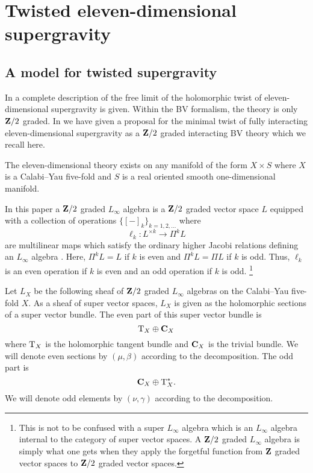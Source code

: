 \documentclass[11pt]{amsart}
\begin{document}
\section{Twisted eleven-dimensional supergravity}

\subsection{A model for twisted supergravity}

In \cite{SWspinor} a complete description of the free limit of the holomorphic twist of eleven-dimensional supergravity is given.
Within the BV formalism, the theory is only $\mathbf{Z}/2$ graded.
In \cite{RSW} we have given a proposal for the minimal twist of fully interacting eleven-dimensional supergravity as a $\mathbf{Z}/2$ graded interacting BV theory which we recall here.

The eleven-dimensional theory exists on any manifold of the form $X \times S$ where $X$ is a Calabi--Yau five-fold and $S$ is a real oriented smooth one-dimensional manifold. 

%

\parsec[s:Lsugra]

In this paper a $\mathbf{Z}/2$ graded $L_\infty$ algebra is a $\mathbf{Z}/2$ graded vector space $L$ equipped with a collection of operations $\{[-]_k\}_{k = 1,2,\ldots}$ where 
\[
\ell_k \colon L^{\times k} \to \Pi^k L 
\]
are multilinear maps which satisfy the ordinary higher Jacobi relations defining an $L_\infty$ algebra \cite{??}. 
Here, $\Pi^k L = L$ if $k$ is even and $\Pi^k L = \Pi L$ if $k$ is odd. 
Thus, $\ell_k$ is an even operation if $k$ is even and an odd operation if $k$ is odd. 
\footnote{This is not to be confused with a super $L_\infty$ algebra which is an $L_\infty$ algebra internal to the category of super vector spaces.
A $\mathbf{Z}/2$ graded $L_\infty$ algebra is simply what one gets when they apply the forgetful function from $\mathbf{Z}$ graded vector spaces to $\mathbf{Z}/2$ graded vector spaces.}

Let $L_X$ be the following sheaf of $\mathbf{Z}/2$ graded $L_\infty$ algebras on the Calabi--Yau five-fold $X$.
As a sheaf of super vector spaces, $L_X$ is given as the holomorphic sections of a super vector bundle. 
The even part of this super vector bundle is
\[
{\rm T}_X \oplus \mathbf{C}_X 
\]
where ${\rm T}_X$ is the holomorphic tangent bundle and $\mathbf{C}_X$ is the trivial bundle.
We will denote even sections by $(\mu, \beta)$ according to the decomposition. 
The odd part is 
\[
\mathbf{C}_X \oplus {\rm T}^*_X .
\]
We will denote odd elements by $(\nu, \gamma)$ according to the decomposition. 
\end{document}
